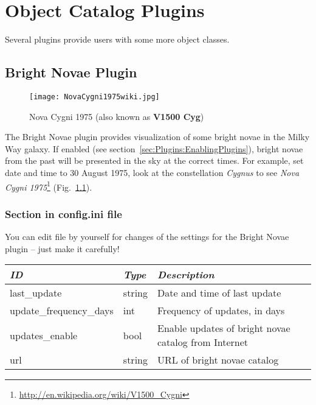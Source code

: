 
\chapter{Object Catalog Plugins}
Several plugins provide users with some more object classes. 


\section{Bright Novae Plugin}
\label{sec:plugins:BrightNovae}

\begin{figure}[ht]
\texttt{[image: NovaCygni1975wiki.jpg]}
\label{fig:NovaCygni1975}
\caption{Nova Cygni 1975 (also known as \textbf{V1500 Cyg})}
\end{figure}


\noindent The Bright Novae plugin provides visualization of some
bright novae in the Milky Way galaxy.
If enabled (see section~\ref{sec:Plugins:EnablingPlugins}), bright
novae from the past will be presented in the sky at the correct
times. For example, set date and time to 30 August 1975, look at the constellation \emph{Cygnus} to see
\emph{Nova Cygni 1975}\footnote{\url{http://en.wikipedia.org/wiki/V1500_Cygni}} (Fig.~\ref{fig:NovaCygni1975}).


\subsection{Section  in config.ini file}
\label{sec:plugins:BrightNovae:config}

You can edit  file by yourself for changes of the
settings for the Bright Novae plugin -- just make it carefully!

\begin{longtabu} to \textwidth {l|l|X}\toprule
\emph{ID}            & \emph{Type} & \emph{Description}\\\midrule
last\_update            & string & Date and time of last update\\\midrule
update\_frequency\_days & int    & Frequency of updates, in days\\\midrule
updates\_enable         & bool   & Enable updates of bright novae catalog from Internet \\\midrule
url                     & string & URL of bright novae catalog \\\bottomrule
\end{longtabu}


